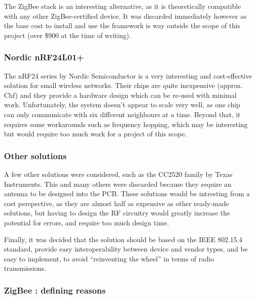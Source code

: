 The ZigBee stack is an interesting alternative, as it is theoretically
compatible with any other ZigBee-certified device. It was discarded immediately
however as the base cost to install and use the framework is way outside the
scope of this project (over \$900 at the time of writing).

\subsubsection{Nordic nRF24L01+}

The nRF24 series by Nordic Semiconductor is a
very interesting and cost-effective solution for small wireless networks. Their
chips are quite inexpensive (approx. \unit[7]{Chf}) and they provide a hardware
design which can be re-used with minimal work. Unfortunately, the system doesn't
appear to scale very well, as one chip can only communicate with six different
neighbours at a time. Beyond that, it requires some workarounds such as
frequency hopping, which may be interesting but would require too much work for
a project of this scope.

\subsubsection{Other solutions}

A few other solutions were considered, such as the CC2520 family by Texas
Instruments. This and many others were discarded because
they require an antenna to be designed into the PCB. These solutions would be
intresting from a cost perspective, as they are almost half as expensive as
other ready-made solutions, but having to design the RF circuitry would greatly
increase the potential for errors, and require too much design time. 

Finally, it was decided that the solution should be based on the IEEE 802.15.4
standard, provide easy interoperability between device and vendor types, and be
easy to implement, to avoid ``reinventing the wheel'' in terms of radio
transmissions.

\subsubsection{ZigBee : defining reasons}
\label{sub:zigbee}

